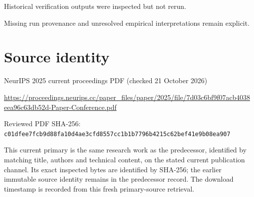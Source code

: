 \documentclass[11pt]{article}
\begin{document}
Historical verification outputs were inspected but not rerun.\par

Missing run provenance and unresolved empirical interpretations remain explicit.\par

\section*{Source identity}

NeurIPS 2025 current proceedings PDF (checked 21 October 2026)

\url{https://proceedings.neurips.cc/paper_files/paper/2025/file/7d03c6bf9f07acb4038eea96c63db52d-Paper-Conference.pdf}

Reviewed PDF SHA-256: \nolinkurl{c01dfee7fcb9d88fa10d4ae3cfd8557cc1b1b7796b4215c62bef41e9b08ea907}

This current primary is the same research work as the predecessor, identified by matching title, authors and technical content, on the stated current publication channel. Its exact inspected bytes are identified by SHA-256; the earlier immutable source identity remains in the predecessor record. The download timestamp is recorded from this fresh primary-source retrieval.
\end{document}
